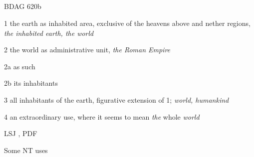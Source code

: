 			\subparagraph{\texorpdfstring{}{}}
				\label{OIKOUMENE}
			
				\begin{compactdesc}
					\item[BDAG 620b] \textbf{}
						\begin{compactitem}
							\item[1] the earth as inhabited area, exclusive of the heavens above and nether regions, \textit{the inhabited earth, the world}
							\item[2] the world as administrative unit, \textit{the Roman Empire}
							\item[2a] as such
							\item[2b] its inhabitants
							\item[3] all inhabitants of the earth, figurative extension of 1; \textit{world, humankind}
							\item[4] an extraordinary use, where it seems to mean \textit{the} whole \textit{world}
						\end{compactitem}
					\item[LSJ , PDF ] \textbf{}
						\begin{compactitem}
							\item 
						\end{compactitem}
				\end{compactdesc}
				
				\begin{compactdesc}
					\item[Some NT uses] \textbf{}
						\begin{compactdesc}
							\item[]
						\end{compactdesc}
				\end{compactdesc}
		
	
		
		
